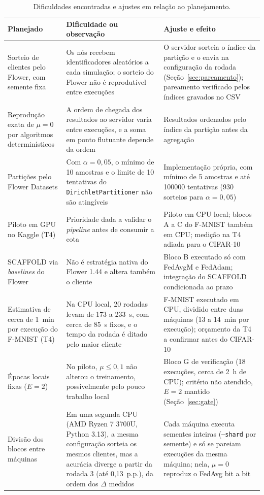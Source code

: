 \begin{table}[t]
    \centering\small
    \caption{Dificuldades encontradas e ajustes em relação ao planejamento.}
    \label{tab:ajustes}
    \begin{tabular}{@{}p{3.6cm}p{6.3cm}p{6.4cm}@{}}
        \toprule
        Planejado & Dificuldade ou observação & Ajuste e efeito \\
        \midrule
        Sorteio de clientes pelo Flower, com semente fixa & Os nós recebem identificadores aleatórios a cada simulação; o sorteio do Flower não é reprodutível entre execuções & O servidor sorteia o índice da partição e o envia na configuração da rodada (Seção~\ref{sec:pareamento}); pareamento verificado pelos índices gravados no CSV \\
        Reprodução exata de $\mu = 0$ por algoritmos determinísticos & A ordem de chegada dos resultados ao servidor varia entre execuções, e a soma em ponto flutuante depende da ordem & Resultados ordenados pelo índice da partição antes da agregação \\
        Partições pelo Flower Datasets & Com $\alpha = 0{,}05$, o mínimo de 10 amostras e o limite de 10 tentativas do \texttt{DirichletPartitioner} não são atingíveis & Implementação própria, com mínimo de 5 amostras e até \num{100000} tentativas (930 sorteios para $\alpha = 0{,}05$) \\
        Piloto em GPU no Kaggle (T4) & Prioridade dada a validar o \textit{pipeline} antes de consumir a cota & Piloto em CPU local; blocos A a C do F-MNIST também em CPU; medição na T4 adiada para o CIFAR-10 \\
        SCAFFOLD via \textit{baselines} do Flower & Não é estratégia nativa do Flower 1.44 e altera também o cliente & Bloco B executado só com FedAvgM e FedAdam; integração do SCAFFOLD condicionada ao prazo \\
        Estimativa de cerca de 1~min por execução do F-MNIST (T4) & Na CPU local, 20 rodadas levam de 173 a 233~s, com cerca de 85~s fixos, e o tempo da rodada é ditado pelo maior cliente & F-MNIST executado em CPU, dividido entre duas máquinas (13 a 14~min por execução); orçamento da T4 a confirmar antes do CIFAR-10 \\
        Épocas locais fixas ($E = 2$) & No piloto, $\mu \leq 0{,}1$ não alterou o treinamento, possivelmente pelo pouco trabalho local & Bloco G de verificação (18 execuções, cerca de 2~h de CPU); critério não atendido, $E = 2$ mantido (Seção~\ref{sec:gate}) \\
        Divisão dos blocos entre máquinas & Em uma segunda CPU (AMD Ryzen 7 3700U, Python 3.13), a mesma configuração sorteia os mesmos clientes, mas a acurácia diverge a partir da rodada 3 (até 0,13~p.p.), da ordem dos $\Delta$ medidos & Cada máquina executa sementes inteiras (\texttt{--shard} por semente) e só se pareiam execuções da mesma máquina; nela, $\mu = 0$ reproduz o FedAvg bit a bit \\

\end{tabular}
\end{table}
